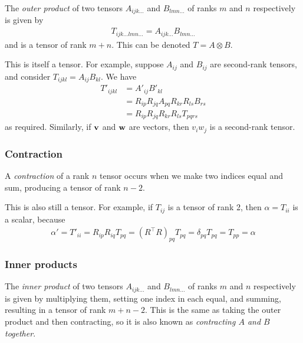 \documentclass{../template/note}
\begin{document}
    \begin{definition*}
        The \emph{outer product} of two tensors \(A_{ijk\dots}\) and \(B_{lmn\dots}\) of ranks \(m\) and \(n\) respectively is given by
        \begin{align*}
            T_{ijk\dots lmn\dots} = A_{ijk\dots}B_{lmn\dots}
        \end{align*}
        and is a tensor of rank \(m+n\). This can be denoted \(T = A \otimes B\).        
    \end{definition*}
    
    This is itself a tensor. For example, suppose \(A_{ij}\) and \(B_{ij}\) are second-rank tensors, and consider \(T_{ijkl} = A_{ij}B_{kl}\). We have
    \begin{align*}
        T'_{ijkl} &= A'_{ij}B'_{kl} \\
        &= R_{ip}R_{jq}A_{pq}R_{kr}R_{ls}B_{rs} \\
        &= R_{ip}R_{jq}R_{kr}R_{ls}T_{pqrs}
    \end{align*}
    as required. Similarly, if \(\V v\) and \(\V w\) are vectors, then \(v_i w_j\) is a second-rank tensor.    
    
    \subsubsection{Contraction}

    \begin{definition*}[Contraction]
        A \emph{contraction} of a rank \(n\) tensor occurs when we make two indices equal and sum, producing a tensor of rank \(n-2\).
    \end{definition*}
    
    This is also still a tensor. For example, if \(T_{ij}\) is a tensor of rank 2, then \(\alpha = T_{ii}\) is a scalar, because
    \begin{align*}
        \alpha' = T'_{ii} = R_{ip}R_{iq}T_{pq} = (R^\intercal R)_{pq} T_{pq} = \delta_{pq} T_{pq} = T_{pp} = \alpha
    \end{align*}
    
    \subsubsection{Inner products}

    \begin{definition*}
        The \emph{inner product} of two tensors \(A_{ijk\dots}\) and \(B_{lmn\dots}\) of ranks \(m\) and \(n\) respectively is given by multiplying them, setting one index in each equal, and summing, resulting in a tensor of rank \(m+n-2\). This is the same as taking the outer product and then contracting, so it is also known as \emph{contracting \(A\) and \(B\) together}.
    \end{definition*}
    
\end{document}
